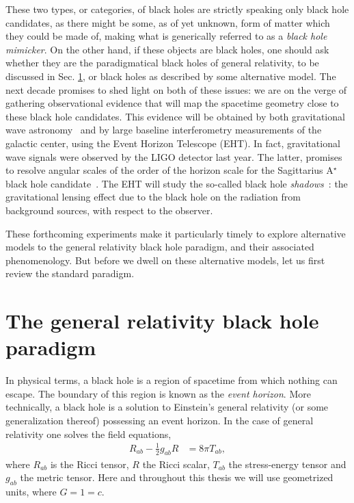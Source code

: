 These two types, or categories, of black holes are strictly speaking only black hole candidates, 
as there might be some, as of yet unknown, form of matter which they could be made of, making what is generically referred to as a \textit{black hole mimicker}.
On the other hand, if these objects are black holes, one should ask whether they are the paradigmatical black holes of general relativity, to be discussed in Sec. \ref{sec:bh_gr}, or black holes as described by some alternative model.
The next decade promises to shed light on both of these issues: we are on the verge of gathering observational evidence that will map the spacetime geometry close to these black hole candidates.
This evidence will be obtained by both gravitational wave astronomy~\cite{Hild:2011np,Hobbs:2009yy,Seoane:2013qna} and by large baseline interferometry measurements of the galactic center, using the Event Horizon Telescope (EHT).
In fact, gravitational wave signals were observed by the LIGO detector last year\cite{Abbott:2016blz,Abbott:2016nmj}.
The latter, promises to resolve angular scales of the order of the horizon scale for the Sagittarius A$^\star$ black hole candidate~\cite{Loeb:2013lfa}.
The EHT will study the so-called black hole \textit{shadows}~\cite{Falcke:1999pj}: the gravitational lensing effect due to the black hole on the radiation from background sources, with respect to the observer.

These forthcoming experiments make it particularly timely to explore alternative models to the general relativity black hole paradigm, and their associated phenomenology.
But before we dwell on these alternative models, let us first review the standard paradigm.
\section{The general relativity black hole paradigm}
\label{sec:bh_gr}

In physical terms, a black hole is a region of spacetime from which nothing can escape.
The boundary of this region is known as the \textit{event horizon}.
More technically, a black hole is a solution to Einstein's general relativity (or some generalization thereof) possessing an event horizon.
In the case of general relativity one solves the field equations,
\begin{align}
  R_{ab} - \frac{1}{2}g_{ab}R  &= 8\pi T_{ab},
  \label{eqn:Einstein-eqns}
\end{align}
where $R_{ab}$ is the Ricci tensor, $R$ the Ricci scalar, $T_{ab}$ the stress-energy tensor and $g_{ab}$ the metric tensor.
Here and throughout this thesis we will use geometrized units, where $G=1=c$.

